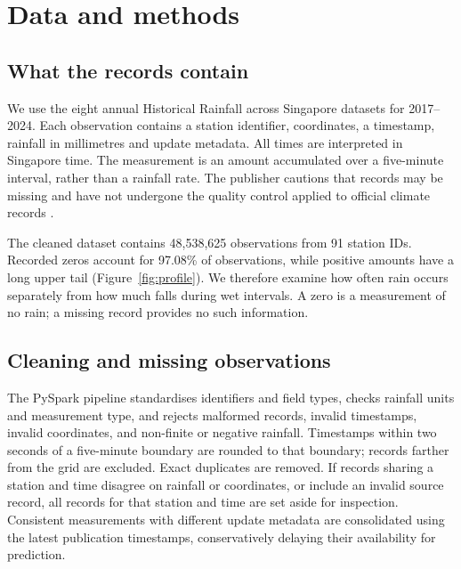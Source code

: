 \section{Data and methods}

\subsection{What the records contain}
We use the eight annual Historical Rainfall across Singapore datasets for 2017--2024. Each observation contains a station identifier, coordinates, a timestamp, rainfall in millimetres and update metadata. All times are interpreted in Singapore time. The measurement is an amount accumulated over a five-minute interval, rather than a rainfall rate. The publisher cautions that records may be missing and have not undergone the quality control applied to official climate records \cite{data}.

The cleaned dataset contains 48,538,625 observations from 91 station IDs. Recorded zeros account for 97.08\% of observations, while positive amounts have a long upper tail (Figure~\ref{fig:profile}). We therefore examine how often rain occurs separately from how much falls during wet intervals. A zero is a measurement of no rain; a missing record provides no such information.


\subsection{Cleaning and missing observations}
The PySpark pipeline standardises identifiers and field types, checks rainfall units and measurement type, and rejects malformed records, invalid timestamps, invalid coordinates, and non-finite or negative rainfall. Timestamps within two seconds of a five-minute boundary are rounded to that boundary; records farther from the grid are excluded. Exact duplicates are removed. If records sharing a station and time disagree on rainfall or coordinates, or include an invalid source record, all records for that station and time are set aside for inspection. Consistent measurements with different update metadata are consolidated using the latest publication timestamps, conservatively delaying their availability for prediction.

